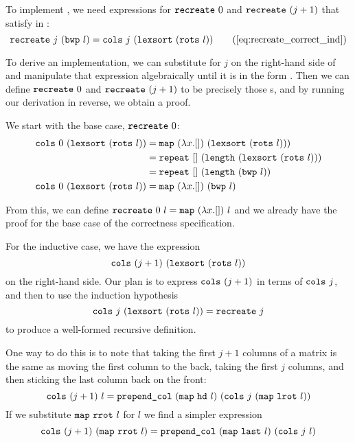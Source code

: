 \documentclass[11pt]{thesis}
\begin{document}
To implement , we need expressions for
$\texttt{recreate}~0$ and $\texttt{recreate}~(j+1)$ that satisfy
 in :
\begin{equation}
  \var{recreate}~j~(\var{bwp}~l) =
  \var{cols}~j~(\var{lexsort}~(\var{rots}~l))
  \tag{\ref{eq:recreate_correct_ind}}
\end{equation}

To derive an implementation, we can substitute for $j$ on the right-hand
side of  and manipulate that expression
algebraically until it is in the form . Then we can
define $\texttt{recreate}~0$ and $\texttt{recreate}~(j+1)$ to be
precisely those \var{\_}s, and by running our derivation in
reverse, we obtain a proof.

We start with the base case, $\texttt{recreate}~0$:
\begin{align*}
     \texttt{cols}~0~(\texttt{lexsort}~(\texttt{rots}~l))
  &= \texttt{map}~(\lambda x.[])~(\texttt{lexsort}~(\texttt{rots}~l))) \\
  &= \texttt{repeat}~[]~(\texttt{length}~(\texttt{lexsort}~(\texttt{rots}~l))) \\
  &= \texttt{repeat}~[]~(\texttt{length}~(\texttt{bwp}~l)) \\
     \texttt{cols}~0~(\texttt{lexsort}~(\texttt{rots}~l))
  &= \texttt{map}~(\lambda x.[])~(\texttt{bwp}~l)
\end{align*}

From this, we can define $\texttt{recreate}~0~l = \texttt{map}~(\lambda
x.[])~l$ and we already have the proof for the base case of the
correctness specification.

For the inductive case, we have the expression
\begin{equation*}
  \texttt{cols}~(j+1)~(\texttt{lexsort}~(\texttt{rots}~l))
\end{equation*}
on the right-hand side. Our plan is to express $\texttt{cols}~(j+1)$
in terms of $\texttt{cols}~j$, and then to use the induction
hypothesis
\begin{equation*}
  \texttt{cols}~j~(\texttt{lexsort}~(\texttt{rots}~l)) = \texttt{recreate}~j
\end{equation*}
to produce a well-formed recursive definition.

One way to do this is to note that taking the first $j+1$ columns of a
matrix is the same as moving the first column to the back, taking the
first $j$ columns, and then sticking the last column back on the
front:
\begin{equation*}
  \texttt{cols}~(j+1)~l =
  \texttt{prepend\_col}~(\texttt{map}~\texttt{hd}~l)~(\texttt{cols}~j~(\texttt{map}~\texttt{lrot}~l))
\end{equation*}
If we substitute $\texttt{map}~\texttt{rrot}~l$ for $l$ we find a simpler expression
\begin{equation}
  \label{eq:cols_rrot}
  \texttt{cols}~(j+1)~(\texttt{map}~\texttt{rrot}~l) =
  \texttt{prepend\_col}~(\texttt{map}~\texttt{last}~l)~(\texttt{cols}~j~l)
\end{equation}
\end{document}
